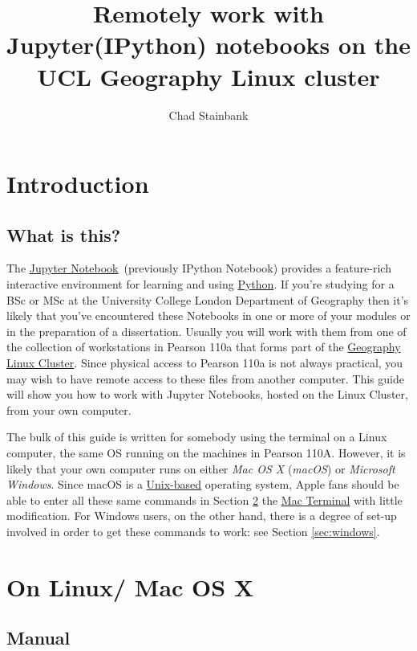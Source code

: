 \documentclass[a4paper]{article}
\title{Remotely work with Jupyter(IPython) notebooks on the UCL Geography Linux cluster}
\author{Chad Stainbank}
\begin{document}
\maketitle
\section{Introduction}
\subsection{What is this?}

The \href{http://jupyter.org/}{Jupyter Notebook}~(previously IPython Notebook) provides a feature-rich interactive environment for learning and using \href{https://www.python.org/}{Python}.
If you're studying for a BSc or MSc at the University College London Department of Geography then it's likely that you've encountered these Notebooks in one or more of your modules or in the preparation of a dissertation.
Usually you will work with them from one of the collection of workstations in Pearson 110a that forms part of the \href{http://www.geog.ucl.ac.uk/resources/computer-support/teaching-cluster}{Geography Linux Cluster}.
Since physical access to Pearson 110a is not always practical, you may wish to have remote access to these files from another computer.
This guide will show you how to work with Jupyter Notebooks, hosted on the Linux Cluster, from your own computer. 

The bulk of this guide is written for somebody using the terminal on a Linux computer, the same OS running on the machines in Pearson 110A.
However, it is likely that your own computer runs on either \emph{Mac OS X} (\emph{macOS}) or \emph{Microsoft Windows}.
Since macOS is a \href{http://unix.stackexchange.com/questions/1489/is-mac-os-x-unix}{Unix-based} operating system, Apple fans should be able to enter all these same commands in Section \ref{sec:linuxmac} the \href{http://www.macworld.co.uk/feature/mac-software/get-more-out-of-os-x-terminal-3608274/}{Mac Terminal} with little modification.
For Windows users, on the other hand, there is a degree of set-up involved in order to get these commands to work: see Section \ref{sec:windows}.

\section{On Linux/ Mac OS X}
\label{sec:linuxmac}
\subsection{Manual}
\label{sec:manual}
\end{document}
